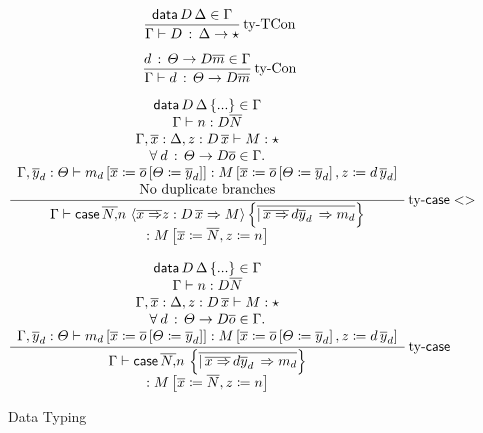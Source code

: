 \begin{figure}
\[
\frac{\mathsf{data}\,D\,\Delta\in\Gamma}{\Gamma\vdash D\,:\,\Delta\rightarrow\star}\operatorname{ty-TCon}
\]

\[
\frac{d\,:\,\varTheta\rightarrow D\overline{m}\in\Gamma}{\Gamma\vdash d\,:\,\varTheta\rightarrow D\overline{m}}\operatorname{ty-Con}
\]

\[
\frac{\begin{array}{c}
\mathsf{data}\,D\,\Delta\left\{ ...\right\} \in\Gamma\\
\Gamma\vdash n:D\overline{N}\\
\Gamma,\overline{x}:\Delta,z:D\,\overline{x}\vdash M:\star\\
\forall\:d\,:\,\varTheta\rightarrow D\overline{o}\in\Gamma.\\
\Gamma,\overline{y}_{d}:\varTheta\vdash m_{d}\left[\overline{x}\coloneqq\overline{o}\left[\varTheta\coloneqq\overline{y}_{d}\right]\right]:M\left[\overline{x}\coloneqq\overline{o}\left[\varTheta\coloneqq\overline{y}_{d}\right],z\coloneqq d\,\overline{y}_{d}\right]\\
\mathrm{No\ duplicate\ branches}
\end{array}}{\begin{array}{c}
\Gamma\vdash \mathsf{case}{} \,\overline{N,}n\,\left\langle \overline{x\Rightarrow}z:D\,\overline{x}\Rightarrow M\right\rangle \left\{ \overline{|\,\overline{x\Rightarrow}\,d\overline{y}_{d}\,\Rightarrow m_{d}}\right\} \\
:M\left[\overline{x}\coloneqq\overline{N},z\coloneqq n\right]
\end{array}
}\operatorname{ty-\mathsf{case}{}<>} 
\]

\[
\frac{\begin{array}{c}
\mathsf{data}\,D\,\Delta\left\{ ...\right\} \in\Gamma\\
\Gamma\vdash n:D\overline{N}\\
\Gamma,\overline{x}:\Delta,z:D\,\overline{x}\vdash M:\star\\
\forall\:d\,:\,\varTheta\rightarrow D\overline{o}\in\Gamma.\\
\Gamma,\overline{y}_{d}:\varTheta\vdash m_{d}\left[\overline{x}\coloneqq\overline{o}\left[\varTheta\coloneqq\overline{y}_{d}\right]\right]:M\left[\overline{x}\coloneqq\overline{o}\left[\varTheta\coloneqq\overline{y}_{d}\right],z\coloneqq d\,\overline{y}_{d}\right]
\end{array}}{\begin{array}{c}
\Gamma\vdash \mathsf{case}{} \,\overline{N,}n\,\left\{ \overline{|\,\overline{x\Rightarrow}\,d\overline{y}_{d}\,\Rightarrow m_{d}}\right\} \\
:M\left[\overline{x}\coloneqq\overline{N},z\coloneqq n\right]
\end{array}
}\operatorname{ty-\mathsf{case}{}}
\]

\caption{\SLang{} Data Typing}
\label{fig:surface-data-ty}
\end{figure}

